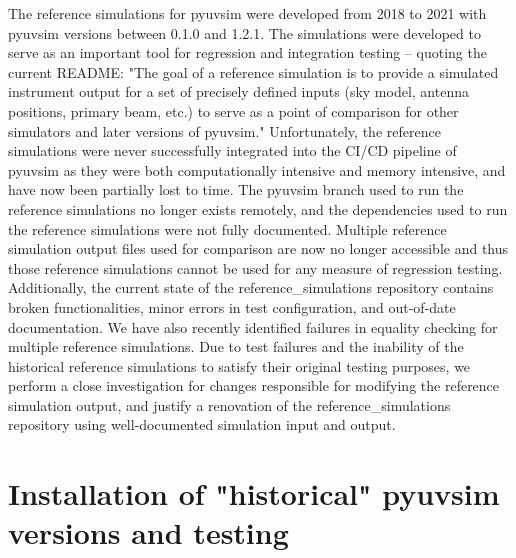 \documentclass[]{article}
\begin{document}
The reference simulations for pyuvsim were developed from 2018 to 2021 with pyuvsim versions between 0.1.0 and 1.2.1. The simulations were developed to serve as an important tool for regression and integration testing -- quoting the current README: "The goal of a reference simulation is to provide a simulated instrument output for a set of precisely defined inputs (sky model, antenna positions, primary beam, etc.) to serve as a point of comparison for other simulators and later versions of pyuvsim." Unfortunately, the reference simulations were never successfully integrated into the CI/CD pipeline of pyuvsim as they were both computationally intensive and memory intensive, and have now been partially lost to time. The pyuvsim branch used to run the reference simulations no longer exists remotely, and the dependencies used to run the reference simulations were not fully documented. Multiple reference simulation output files used for comparison are now no longer accessible and thus those reference simulations cannot be used for any measure of regression testing. Additionally, the current state of the reference\_simulations repository contains broken functionalities, minor errors in test configuration, and out-of-date documentation. We have also recently identified failures in equality checking for multiple reference simulations. Due to test failures and the inability of the historical reference simulations to satisfy their original testing purposes, we perform a close investigation for changes responsible for modifying the reference simulation output, and justify a renovation of the reference\_simulations repository using well-documented simulation input and output.

\section{Installation of "historical" pyuvsim versions and testing}
\end{document}
